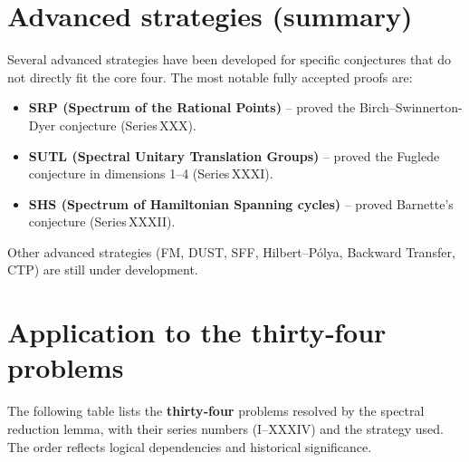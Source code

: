 \documentclass[11pt,a4paper]{article}
\begin{document}
\section{Advanced strategies (summary)}

Several advanced strategies have been developed for specific conjectures that do not directly fit the core four. The most notable fully accepted proofs are:
\begin{itemize}
\item \textbf{SRP (Spectrum of the Rational Points)} – proved the Birch–Swinnerton-Dyer conjecture (Series XXX).
\item \textbf{SUTL (Spectral Unitary Translation Groups)} – proved the Fuglede conjecture in dimensions 1–4 (Series XXXI).
\item \textbf{SHS (Spectrum of Hamiltonian Spanning cycles)} – proved Barnette's conjecture (Series XXXII).
\end{itemize}
Other advanced strategies (FM, DUST, SFF, Hilbert–Pólya, Backward Transfer, CTP) are still under development.

\section{Application to the thirty‑four problems}

The following table lists the \textbf{thirty‑four} problems resolved by the spectral reduction lemma, with their series numbers (I–XXXIV) and the strategy used. The order reflects logical dependencies and historical significance.
\end{document}
